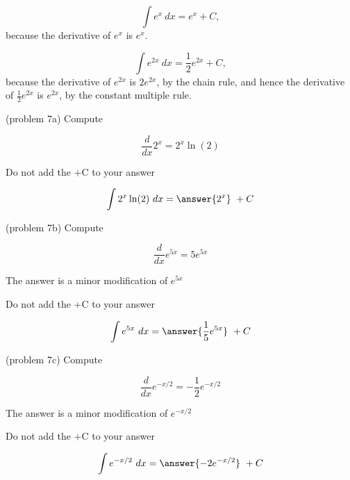 \documentclass[handout]{ximera}
\begin{document}
\begin{example}[example 7]
\[
\int e^x \ dx = e^x + C,
\]
because the derivative of $e^x$ is $e^x$.

\end{example}

\begin{example} %
\[
\int e^{2x} \ dx = \frac12 e^{2x} + C,
\]
because the derivative of $e^{2x}$ is $2e^{2x}$, by the chain rule,
and hence the derivative of $\frac12 e^{2x}$ is $e^{2x}$, by the constant multiple rule.

\end{example}

\begin{problem}(problem 7a)
Compute 

\begin{hint}
\[
\frac{d}{dx} 2^x = 2^x \ln(2)
\]
\end{hint}
\begin{hint}
\begin{center}
Do not add the +C to your answer
\end{center}
\end{hint}

\[
\int 2^x \ln(2) \ dx =
\answer{2^x} \ + C
\]
\end{problem}

\begin{problem}(problem 7b)
Compute 

\begin{hint}
\[
\frac{d}{dx} e^{5x} = 5e^{5x}
\]
\end{hint}
\begin{hint}
The answer is a minor modification of $e^{5x}$
\end{hint}
\begin{hint}
\begin{center}
Do not add the +C to your answer
\end{center}
\end{hint}

\[
\int e^{5x} \ dx =
\answer{\frac15 e^{5x}} \ + C
\]
\end{problem}

\begin{problem}(problem 7c)
Compute 

\begin{hint}
\[
\frac{d}{dx} e^{-x/2} = -\frac12 e^{-x/2}
\]
\end{hint}
\begin{hint}
The answer is a minor modification of $e^{-x/2}$
\end{hint}
\begin{hint}
\begin{center}
Do not add the +C to your answer
\end{center}
\end{hint}

\[
\int e^{-x/2} \ dx =
\answer{-2 e^{-x/2}} \ + C
\]
\end{problem}
\end{document}
